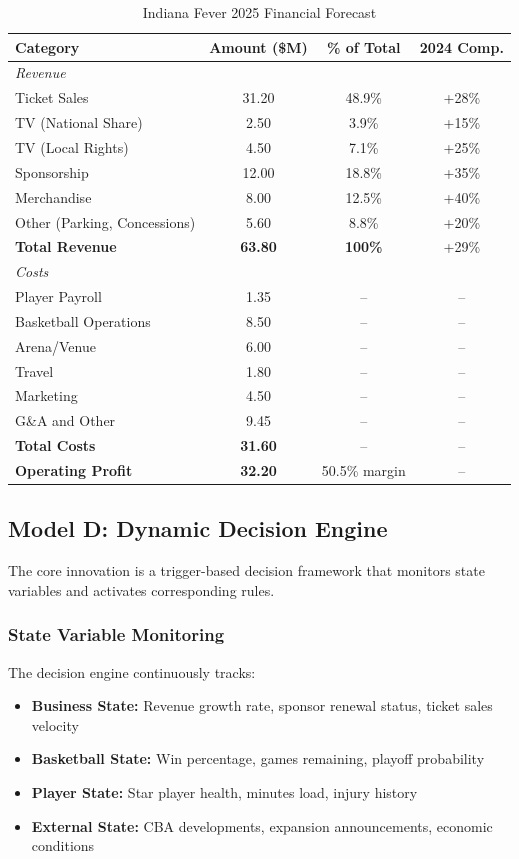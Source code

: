 \documentclass{mcmthesis}
\begin{document}
\begin{table}[H]
\centering
\caption{Indiana Fever 2025 Financial Forecast}
\begin{tabular}{lccc}
\toprule
\textbf{Category} & \textbf{Amount (\$M)} & \textbf{\% of Total} & \textbf{2024 Comp.} \\
\midrule
\multicolumn{4}{l}{\textit{Revenue}} \\
Ticket Sales & 31.20 & 48.9\% & +28\% \\
TV (National Share) & 2.50 & 3.9\% & +15\% \\
TV (Local Rights) & 4.50 & 7.1\% & +25\% \\
Sponsorship & 12.00 & 18.8\% & +35\% \\
Merchandise & 8.00 & 12.5\% & +40\% \\
Other (Parking, Concessions) & 5.60 & 8.8\% & +20\% \\
\midrule
\textbf{Total Revenue} & \textbf{63.80} & \textbf{100\%} & +29\% \\
\midrule
\multicolumn{4}{l}{\textit{Costs}} \\
Player Payroll & 1.35 & -- & -- \\
Basketball Operations & 8.50 & -- & -- \\
Arena/Venue & 6.00 & -- & -- \\
Travel & 1.80 & -- & -- \\
Marketing & 4.50 & -- & -- \\
G\&A and Other & 9.45 & -- & -- \\
\midrule
\textbf{Total Costs} & \textbf{31.60} & -- & -- \\
\midrule
\textbf{Operating Profit} & \textbf{32.20} & 50.5\% margin & -- \\
\bottomrule
\end{tabular}
\end{table}

\subsection{Model D: Dynamic Decision Engine}

The core innovation is a trigger-based decision framework that monitors state variables and activates corresponding rules.

\subsubsection{State Variable Monitoring}

The decision engine continuously tracks:
\begin{itemize}
\item \textbf{Business State:} Revenue growth rate, sponsor renewal status, ticket sales velocity
\item \textbf{Basketball State:} Win percentage, games remaining, playoff probability
\item \textbf{Player State:} Star player health, minutes load, injury history
\item \textbf{External State:} CBA developments, expansion announcements, economic conditions
\end{itemize}
\end{document}

